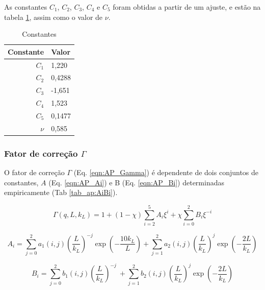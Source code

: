 \begin{apendicesenv}
As constantes $C_1$, $C_2$, $C_3$, $C_4$ e $C_5$ foram obtidas a partir de um ajuste, e estão na tabela \ref{tab_ap:C1C5}, assim como o valor de $\nu$.
\begin{table}
    \IBGEtab%
    {\caption{Constantes}
    \label{tab_ap:C1C5} }%
    {\begin{tabular}{r p{2cm}}
      \toprule
      Constante 	& Valor \\
      \midrule
      $C_1$			&  1,220	\\
      $C_2$			&  0,4288	\\
      $C_3$			&  -1,651	\\
      $C_4$			&  1,523	\\
      $C_5$			&  0,1477 	\\	
      $\nu$			&  0,585	\\					
      \bottomrule
    \end{tabular}}%
    {}%
\end{table}


\subsubsection{Fator de correção $\Gamma$}

O fator de correção $\Gamma$ (Eq. \ref{eqn:AP_Gamma}) é dependente de dois conjuntos de constantes, $A$ (Eq. \ref{eqn:AP_Ai}) e B (Eq. \ref{eqn:AP_Bi}) determinadas empiricamente (Tab \ref{tab_ap:AiBi}).

\begin{equation}
\Gamma\left( q,L,k_{L} \right) = 1 + \left( 1 - \chi \right)\sum_{i = 2}^{5}{A_{i}\xi^{i}} + \chi\sum_{i = 0}^{2}{B_{i}\xi^{- i}}
\label{eqn:AP_Gamma}
\end{equation}

\begin{equation}
A_{i} = \sum_{j = 0}^{2}{a_{1}\left( i,j \right)\left( \frac{L}{k_{L}} \right)^{- j}\exp\left( - \frac{10k_{L}}{L} \right)} + \sum_{j = 1}^{2}{a_{2}\left( i,j \right)\left( \frac{L}{k_{L}} \right)^{j}\exp\left( - \frac{2L}{k_{L}} \right)}
\label{eqn:AP_Ai}
\end{equation}

\begin{equation}
B_{i} = \sum_{j = 0}^{2}{b_{1}\left( i,j \right)\left( \frac{L}{k_{L}} \right)^{- j}\ } + \sum_{j = 1}^{2}{b_{2}\left( i,j \right)\left( \frac{L}{k_{L}} \right)^{j}\exp\left( - \frac{2L}{k_{L}} \right)}
\label{eqn:AP_Bi}
\end{equation}


\end{apendicesenv}
